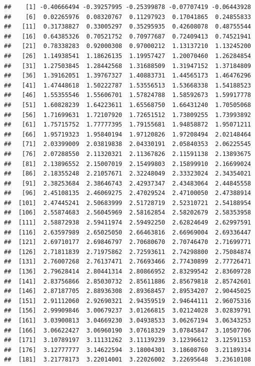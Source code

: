 \documentclass[
  11pt]{report}
\begin{document}
\begin{itemize}
\begin{verbatim}
##    [1] -0.40666494 -0.39257995 -0.25399878 -0.07707419 -0.06443928
##    [6]  0.02265976  0.08320767  0.11297923  0.17041865  0.24855833
##   [11]  0.31738827  0.33005297  0.35295935  0.42608078  0.48755544
##   [16]  0.64385326  0.70521752  0.70977687  0.72409413  0.74521941
##   [21]  0.78338283  0.92000308  0.97000212  1.13137210  1.13245200
##   [26]  1.14938541  1.18626135  1.19957427  1.20070460  1.26284854
##   [31]  1.27503845  1.28442568  1.31688509  1.31947152  1.37184809
##   [36]  1.39162051  1.39767327  1.40883731  1.44565173  1.46476296
##   [41]  1.47448618  1.50222787  1.53556513  1.53668338  1.54188523
##   [46]  1.55355546  1.55606701  1.57824788  1.58592673  1.59917778
##   [51]  1.60828239  1.64223611  1.65568750  1.66431240  1.70505068
##   [56]  1.71699631  1.72107920  1.72651512  1.73809255  1.73993892
##   [61]  1.75715752  1.77777395  1.79155681  1.94858872  1.95071211
##   [66]  1.95719323  1.95840194  1.97120826  1.97208494  2.02148464
##   [71]  2.03399009  2.03819838  2.04330191  2.05840353  2.06225545
##   [76]  2.07288550  2.11320321  2.11367826  2.11591138  2.13893675
##   [81]  2.13896552  2.15007019  2.15499803  2.15899910  2.16699024
##   [86]  2.18355248  2.21057671  2.32248049  2.33323024  2.34354021
##   [91]  2.38253684  2.38646743  2.42937347  2.43483064  2.44845558
##   [96]  2.45108135  2.46069275  2.47029524  2.47100050  2.47388914
##  [101]  2.47445241  2.50683999  2.51728719  2.52310721  2.54188954
##  [106]  2.55874683  2.56045969  2.58162854  2.58202679  2.58353958
##  [111]  2.58872938  2.59411974  2.59492250  2.62824649  2.62997591
##  [116]  2.63597989  2.65025050  2.66463816  2.66969004  2.69336447
##  [121]  2.69710177  2.69846797  2.70680670  2.70746470  2.71699771
##  [126]  2.71811839  2.71975862  2.72593611  2.74298800  2.75084874
##  [131]  2.76007268  2.76137471  2.76693466  2.77430899  2.77726471
##  [136]  2.79628414  2.80441314  2.80866952  2.83299542  2.83609728
##  [141]  2.83756866  2.85030732  2.85611886  2.85679818  2.85742601
##  [146]  2.87187705  2.88936308  2.89368457  2.89534207  2.90445025
##  [151]  2.91112060  2.92690321  2.94359519  2.94644111  2.96075316
##  [156]  2.99909846  3.00679237  3.01266815  3.02124028  3.02839791
##  [161]  3.03900813  3.04669230  3.04938533  3.06267194  3.06343253
##  [166]  3.06622427  3.06960190  3.07618329  3.07845847  3.10507706
##  [171]  3.10789197  3.11131262  3.11139239  3.12396612  3.12591153
##  [176]  3.12777777  3.14622594  3.18004301  3.18608760  3.21189314
##  [181]  3.21778173  3.22014001  3.22026002  3.22695648  3.23610108

\end{verbatim}
\end{itemize}
\end{document}
